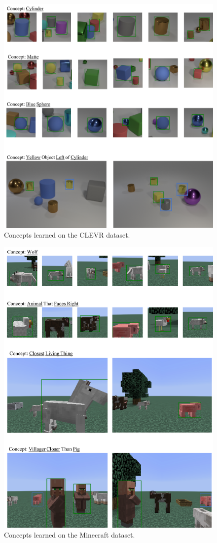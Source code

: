\documentclass{article} %
\begin{document}
{\begin{figure}[ht]
    \centering
    \includegraphics[width=\textwidth]{raw/CLEVRConcept.pdf}
    \caption{Concepts learned on the CLEVR dataset.}
    \label{fig:vis:clevr:concept}
\end{figure}

\begin{figure}[ht]
    \centering
    \includegraphics[width=\textwidth]{raw/MCConcept.pdf}
    \caption{Concepts learned on the Minecraft dataset.}
    \label{fig:vis:mc:concept}
\end{figure}
} 
\end{document}
